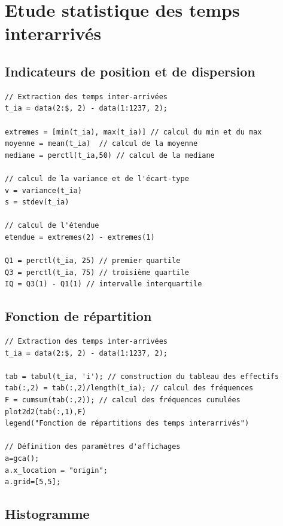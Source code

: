 \documentclass{article}
\begin{document}
\paragraph{}

\newpage
\appendix

\section{Etude statistique des temps interarrivés}

\subsection{Indicateurs de position et de dispersion}
\begin{verbatim}
// Extraction des temps inter-arrivées
t_ia = data(2:$, 2) - data(1:1237, 2);

extremes = [min(t_ia), max(t_ia)] // calcul du min et du max
moyenne = mean(t_ia)  // calcul de la moyenne
mediane = perctl(t_ia,50) // calcul de la mediane

// calcul de la variance et de l'écart-type
v = variance(t_ia)
s = stdev(t_ia)

// calcul de l'étendue
etendue = extremes(2) - extremes(1)

Q1 = perctl(t_ia, 25) // premier quartile
Q3 = perctl(t_ia, 75) // troisième quartile
IQ = Q3(1) - Q1(1) // intervalle interquartile
\end{verbatim}

\subsection{Fonction de répartition}
\begin{verbatim}
// Extraction des temps inter-arrivées
t_ia = data(2:$, 2) - data(1:1237, 2);

tab = tabul(t_ia, 'i'); // construction du tableau des effectifs
tab(:,2) = tab(:,2)/length(t_ia); // calcul des fréquences
F = cumsum(tab(:,2)); // calcul des fréquences cumulées
plot2d2(tab(:,1),F)
legend("Fonction de répartitions des temps interarrivés")

// Définition des paramètres d'affichages
a=gca();
a.x_location = "origin";
a.grid=[5,5];

\end{verbatim}

\subsection{Histogramme}
\end{document}
